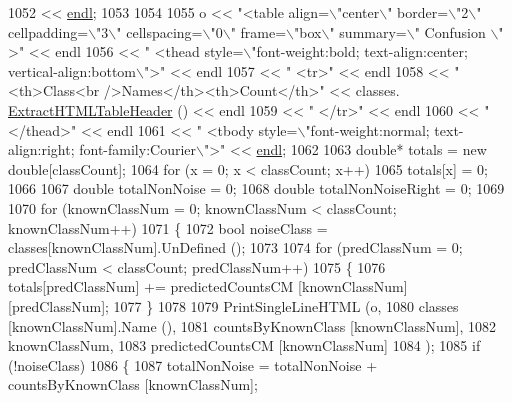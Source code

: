 \begin{DoxyCode}
{1052     << \hyperlink{namespace_k_k_b_ad1f50f65af6adc8fa9e6f62d007818a8}{endl};
1053 
1054 
1055   o << \textcolor{stringliteral}{"<table align=\(\backslash\)"center\(\backslash\)" border=\(\backslash\)"2\(\backslash\)" cellpadding=\(\backslash\)"3\(\backslash\)" cellspacing=\(\backslash\)"0\(\backslash\)" frame=\(\backslash\)"box\(\backslash\)"  summary=\(\backslash\)"
      Confusion \(\backslash\)" >"} << endl
1056     << \textcolor{stringliteral}{"  <thead style=\(\backslash\)"font-weight:bold; text-align:center; vertical-align:bottom\(\backslash\)">"}          << endl
1057     << \textcolor{stringliteral}{"    <tr>"}                                                                                << endl
1058     << \textcolor{stringliteral}{"        <th>Class<br />Names</th><th>Count</th>"} << classes.
      \hyperlink{class_k_k_m_l_l_1_1_m_l_class_list_a9fdbe03268aed67b977f28a48a26a85e}{ExtractHTMLTableHeader} ()    << endl
1059     << \textcolor{stringliteral}{"    </tr>"}                                                                               << endl
1060     << \textcolor{stringliteral}{"  </thead>"}                                                                              << endl
1061     << \textcolor{stringliteral}{"  <tbody style=\(\backslash\)"font-weight:normal; text-align:right; font-family:Courier\(\backslash\)">"} << 
      \hyperlink{namespace_k_k_b_ad1f50f65af6adc8fa9e6f62d007818a8}{endl};
1062 
1063   \textcolor{keywordtype}{double}*  totals = \textcolor{keyword}{new} \textcolor{keywordtype}{double}[classCount];
1064   \textcolor{keywordflow}{for}  (x = 0; x < classCount; x++)
1065     totals[x] = 0;
1066 
1067   \textcolor{keywordtype}{double}  totalNonNoise = 0;
1068   \textcolor{keywordtype}{double}  totalNonNoiseRight = 0;
1069 
1070   \textcolor{keywordflow}{for}  (knownClassNum = 0;  knownClassNum < classCount;  knownClassNum++)
1071   \{
1072     \textcolor{keywordtype}{bool}  noiseClass = classes[knownClassNum].UnDefined ();
1073 
1074     \textcolor{keywordflow}{for}  (predClassNum = 0; predClassNum < classCount; predClassNum++)
1075     \{
1076       totals[predClassNum] += predictedCountsCM [knownClassNum] [predClassNum];
1077     \}
1078 
1079     PrintSingleLineHTML (o, 
1080                          classes            [knownClassNum].Name (),
1081                          countsByKnownClass [knownClassNum],
1082                          knownClassNum,
1083                          predictedCountsCM  [knownClassNum]
1084                         );
1085     \textcolor{keywordflow}{if}  (!noiseClass)
1086     \{
1087       totalNonNoise      = totalNonNoise      + countsByKnownClass [knownClassNum];
}
\end{DoxyCode}
